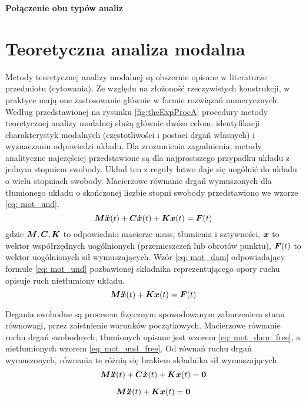 \textbf{Połączenie obu typów analiz}

\section{Teoretyczna analiza modalna}
\label{section: eigen}
Metody teoretycznej analizy modalnej są obszernie opisane w literaturze przedmiotu (cytowania). Ze względu na złożoność rzeczywistych konstrukcji, w praktyce mają one zastosowanie głównie w formie rozwiązań numerycznych.  Według przedstawionej na rysunku \ref{fig:theExpProcA} procedury metody teoretycznej analizy modalnej służą głównie dwóm celom: identyfikacji charakterystyk modalnych (częstotliwości i postaci drgań własnych) i wyznaczaniu odpowiedzi układu. Dla zrozumienia zagadnienia, metody analityczne najczęściej przedstawione są dla najprostszego przypadku układu z jednym stopniem swobody. Układ ten z reguły łatwo daje się uogólnić do układu o wielu stopniach swobody. Macierzowe równanie drgań wymuszonych dla tłumionego układu o skończonej liczbie stopni swobody przedstawiono we wzorze \ref{eq: mot_und}. 
\begin{equation} \label{eq: mot_und}
\bm{M} \bm{\ddot{x}}(t) +\bm{C} \bm{\dot{x}}(t)+ \bm{Kx}(t) = \bm{F}(t)
\end{equation}
gdzie $\bm{M},\bm{C},\bm{K}$ to odpowiednio macierze mass, tłumienia i sztywności, $\bm{x}$ to wektor współrzędnych uogólnionych (przemieszczeń lub obrotów punktu), $\bm{F}(t)$ to wektor uogólnionych sił wymuszających. Wzór \ref{eq: mot_dam} odpowiadający formule \ref{eq: mot_und} pozbawionej składnika reprezentującego opory ruchu opisuje ruch nietłumiony układu. 
\begin{equation} \label{eq: mot_dam}
\bm{M} \bm{\ddot{x}}(t) +\bm{Kx}(t) = \bm{F}(t)
\end{equation}

Drgania swobodne są procesem fizycznym spowodowanym zaburzeniem stanu równowagi, przez zaistnienie warunków początkowych. Macierzowe równanie ruchu drgań swobodnych, tłumionych opisane jest wzorem \ref{eq: mot_dam_free}, a nietłumionych wzorem \ref{eq: mot_und_free}. Od równań ruchu drgań wymuszonych, równania te różnią się brakiem składnika sił wymuszających.
\begin{equation} \label{eq: mot_dam_free}
\bm{M} \bm{\ddot{x}}(t) +\bm{C} \bm{\dot{x}}(t)+ \bm{Kx}(t) = \bm{0}
\end{equation}

\begin{equation} \label{eq: mot_und_free}
\bm{M} \bm{\ddot{x}}(t) +\bm{Kx}(t) = \bm{0}
\end{equation}


